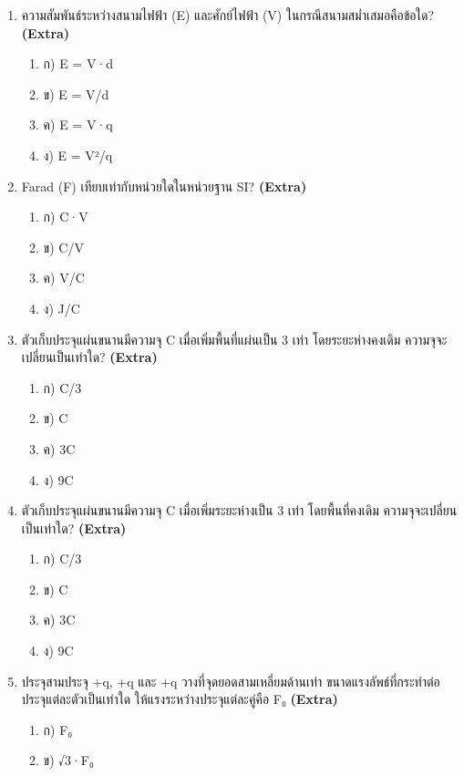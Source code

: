 \documentclass[12pt]{article}
\begin{document}
\begin{enumerate}[label=\arabic*.]
\begin{enumerate}[label=)]
\item ก) 1 m
\item ข) 2 m
\item ค) 3 m
\item ง) 4 m
\end{enumerate}
\item ความสัมพันธ์ระหว่างสนามไฟฟ้า (E) และศักย์ไฟฟ้า (V) ในกรณีสนามสม่ำเสมอคือข้อใด? \hfill \textbf{\small (Extra)}
\begin{enumerate}[label=)]
\item ก) E = V·d
\item ข) E = V/d
\item ค) E = V·q
\item ง) E = V²/q
\end{enumerate}
\item Farad (F) เทียบเท่ากับหน่วยใดในหน่วยฐาน SI? \hfill \textbf{\small (Extra)}
\begin{enumerate}[label=)]
\item ก) C·V
\item ข) C/V
\item ค) V/C
\item ง) J/C
\end{enumerate}
\item ตัวเก็บประจุแผ่นขนานมีความจุ C เมื่อเพิ่มพื้นที่แผ่นเป็น 3 เท่า โดยระยะห่างคงเดิม ความจุจะเปลี่ยนเป็นเท่าใด? \hfill \textbf{\small (Extra)}
\begin{enumerate}[label=)]
\item ก) C/3
\item ข) C
\item ค) 3C
\item ง) 9C
\end{enumerate}
\item ตัวเก็บประจุแผ่นขนานมีความจุ C เมื่อเพิ่มระยะห่างเป็น 3 เท่า โดยพื้นที่คงเดิม ความจุจะเปลี่ยนเป็นเท่าใด? \hfill \textbf{\small (Extra)}
\begin{enumerate}[label=)]
\item ก) C/3
\item ข) C
\item ค) 3C
\item ง) 9C
\end{enumerate}
\item ประจุสามประจุ +q, +q และ +q วางที่จุดยอดสามเหลี่ยมด้านเท่า ขนาดแรงลัพธ์ที่กระทำต่อประจุแต่ละตัวเป็นเท่าใด ให้แรงระหว่างประจุแต่ละคู่คือ F₀ \hfill \textbf{\small (Extra)}
\begin{enumerate}[label=)]
\item ก) F₀
\item ข) √3·F₀

\end{enumerate}
\end{enumerate}
\end{document}
